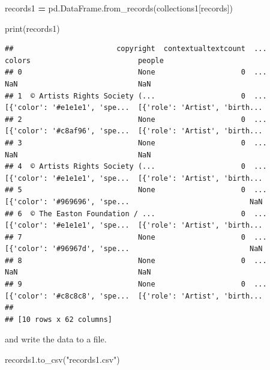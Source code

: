 \documentclass[
]{book}
\newenvironment{Shaded}{\begin{snugshade}}{\end{snugshade}}
\newcommand{\BuiltInTok}[1]{#1}
\newcommand{\NormalTok}[1]{#1}
\newcommand{\OperatorTok}[1]{\textcolor[rgb]{0.81,0.36,0.00}{\textbf{#1}}}
\newcommand{\StringTok}[1]{\textcolor[rgb]{0.31,0.60,0.02}{#1}}
\begin{document}
\begin{Shaded}
\begin{Highlighting}[]
\NormalTok{records1 }\OperatorTok{=}\NormalTok{ pd.DataFrame.from\_records(collections1[}\StringTok{\textquotesingle{}records\textquotesingle{}}\NormalTok{])}
\end{Highlighting}
\end{Shaded}

\begin{Shaded}
\begin{Highlighting}[]
\BuiltInTok{print}\NormalTok{(records1)}
\end{Highlighting}
\end{Shaded}

\begin{verbatim}
##                        copyright  contextualtextcount  ...                         colors                         people
## 0                           None                    0  ...                            NaN                            NaN
## 1  © Artists Rights Society (...                    0  ...  [{'color': '#e1e1e1', 'spe...  [{'role': 'Artist', 'birth...
## 2                           None                    0  ...  [{'color': '#c8af96', 'spe...  [{'role': 'Artist', 'birth...
## 3                           None                    0  ...                            NaN                            NaN
## 4  © Artists Rights Society (...                    0  ...  [{'color': '#e1e1e1', 'spe...  [{'role': 'Artist', 'birth...
## 5                           None                    0  ...  [{'color': '#969696', 'spe...                            NaN
## 6  © The Easton Foundation / ...                    0  ...  [{'color': '#e1e1e1', 'spe...  [{'role': 'Artist', 'birth...
## 7                           None                    0  ...  [{'color': '#96967d', 'spe...                            NaN
## 8                           None                    0  ...                            NaN                            NaN
## 9                           None                    0  ...  [{'color': '#c8c8c8', 'spe...  [{'role': 'Artist', 'birth...
## 
## [10 rows x 62 columns]
\end{verbatim}

and write the data to a file.

\begin{Shaded}
\begin{Highlighting}[]
\NormalTok{records1.to\_csv(}\StringTok{"records1.csv"}\NormalTok{)}
\end{Highlighting}
\end{Shaded}
\end{document}
